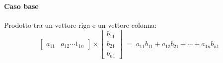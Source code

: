 \documentclass[11pt,oneside]{book}
\begin{document}
\paragraph{Caso base} Prodotto tra un vettore riga e un vettore colonna:
\begin{equation*}
    \begin{bmatrix}
        a_{11} & a_{12} \cdots 1_{1n}
    \end{bmatrix}
    \times
    \begin{bmatrix}
        b_{11} \\ b_{21} \\ b_{n1}
    \end{bmatrix}
    \; = \; a_{11}b_{11} + a_{12}b_{21} + \cdots + a_{1n}b_{n1}
\end{equation*}
\end{document}

